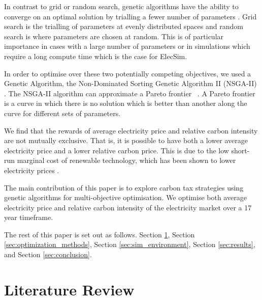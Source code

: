 \documentclass[sigconf]{acmart}
\begin{document}
In contrast to grid or random search, genetic algorithms have the ability to converge on an optimal solution by trialling a fewer number of parameters \cite{Bergstra2012}. Grid search is the trialling of parameters at evenly distributed spaces and random search is where parameters are chosen at random. This is of particular importance in cases with a large number of parameters or in simulations which require a long compute time which is the case for ElecSim.

In order to optimise over these two potentially competing objectives, we used a Genetic Algorithm, the Non-Dominated Sorting Genetic Algorithm II (NSGA-II) \cite{Valkanas2014}. The NSGA-II algorithm can approximate a Pareto frontier ~\cite{Pareto1927, Stadler1979}. A Pareto frontier is a curve in which there is no solution which is better than another along the curve for different sets of parameters.

We find that the rewards of average electricity price and relative carbon intensity are not mutually exclusive. That is, it is possible to have both a lower average electricity price and a lower relative carbon price. This is due to the low short-run marginal cost of renewable technology, which has been shown to lower electricity prices \cite{OMahoney2011}.

The main contribution of this paper is to explore carbon tax strategies using genetic algorithms for multi-objective optimisation. We optimise both average electricity price and relative carbon intensity of the electricity market over a 17 year timeframe.

{\color{red} The rest of this paper is set out as follows. Section \ref{sec:lit_review}, Section \ref{sec:optimization_methods}, Section \ref{sec:sim_environment}, Section \ref{sec:results}, and Section \ref{sec:conclusion}}.











\section{Literature Review}
\label{sec:lit_review}
\end{document}

